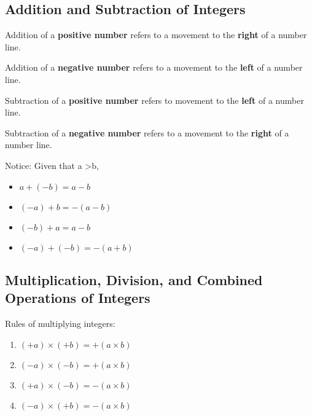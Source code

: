 \documentclass[../main]{subfiles}
\begin{document}
\subsection{Addition and Subtraction of Integers}

Addition of a \textbf{positive number} refers to a movement to the \textbf{right} of a
number line.

Addition of a \textbf{negative number} refers to a movement to the \textbf{left}
of a number line.
 
Subtraction of a \textbf{positive number} refers to movement to the
\textbf{left} of a number line.

Subtraction of a \textbf{negative number} refers to a movement to the
\textbf{right} of a number line.

Notice: Given that a \textgreater b,
\begin{itemize}
\item \(a + (-b) = a - b \)
\item \((-a) +b = -(a - b)\)
\item \((-b)+ a = a -b\)
\item \((-a)+(-b)= -(a+b)\)
\end{itemize}

\subsection{Multiplication, Division, and Combined Operations of Integers}
Rules of multiplying integers:
\begin{enumerate}
\item \((+a) \times (+b) = +(a \times b)\)  
\item \((-a) \times (-b) = +(a \times b)\) 
\item \((+a) \times (-b) = -(a \times b)\)
\item \((-a) \times (+b) = -(a \times b) \)

\end{enumerate}
\end{document}
